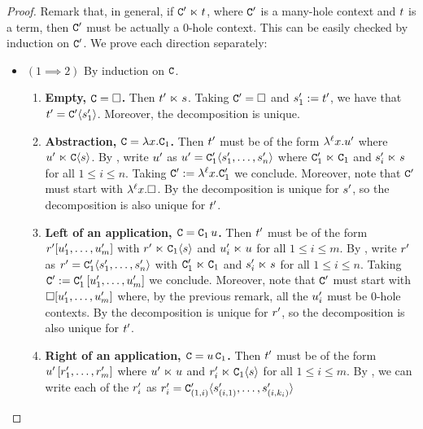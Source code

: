 \begin{proof}
Remark that, in general, if $\mathtt{C}' \mathrel{\ltimes} t$, where $\mathtt{C}'$ is a many-hole context and $t$ is a term,
then $\mathtt{C}'$ must be actually a $0$-hole context. This can be easily checked by induction on $\mathtt{C}'$.
We prove each direction separately:
\begin{itemize}
\item $(1 \implies 2)$
  By induction on $\mathtt{C}$.
  \begin{enumerate}
  \item {\bf Empty, $\mathtt{C} = \Box$.}
    Then $t' \mathrel{\ltimes} s$.
    Taking $\mathtt{C}' = \Box$ and $s'_1 := t'$,
    we have that $t' = \mathtt{C}'\langle s'_1\rangle$.
    Moreover, the decomposition is unique.
  \item {\bf Abstraction, $\mathtt{C} = \lambda x. \mathtt{C}_1$.}
    Then $t'$ must be of the form $\lambda^{\ell} x. u'$
    where $u' \mathrel{\ltimes} \mathtt{C}\langle s\rangle$.
    By \ih, write $u'$ as $u' = \mathtt{C}'_1\langle s'_1,\hdots,s'_n\rangle$
    where $\mathtt{C}'_1 \mathrel{\ltimes} \mathtt{C}_1$ and $s'_i \mathrel{\ltimes} s$ for all $1 \leq i \leq n$.
    Taking $\mathtt{C}' := \lambda^{\ell} x. \mathtt{C}'_1$ we conclude.
    Moreover, note that $\mathtt{C}'$ must start with $\lambda^{\ell} x. \Box$.
    By \ih the decomposition is unique for $s'$, so the decomposition is also unique for $t'$.
  \item {\bf Left of an application, $\mathtt{C} = \mathtt{C}_1\,u$.}
    Then $t'$ must be of the form $r'[u'_1,\hdots,u'_m]$
    with $r' \mathrel{\ltimes} \mathtt{C}_1\langle s\rangle$
    and $u'_i \mathrel{\ltimes} u$ for all $1 \leq i \leq m$.
    By \ih, write $r'$ as $r' = \mathtt{C}'_1\langle s'_1,\hdots,s'_n\rangle$
    with $\mathtt{C}'_1 \mathrel{\ltimes} \mathtt{C}_1$ and $s'_i \mathrel{\ltimes} s$ for all $1 \leq i \leq n$.
    Taking $\mathtt{C}' := \mathtt{C}'_1\,[u'_1,\hdots,u'_m]$ we conclude.
    Moreover, note that $\mathtt{C}'$ must start with $\Box[u'_1,\hdots,u'_m]$
    where, by the previous remark, all the $u'_i$ must be $0$-hole contexts.
    By \ih the decomposition is unique for $r'$, so the decomposition is also unique for $t'$.
  \item {\bf Right of an application, $\mathtt{C} = u\,\mathtt{C}_1$.}
    Then $t'$ must be of the form $u'\,[r'_1,\hdots,r'_m]$
    where $u' \mathrel{\ltimes} u$ and $r'_i \mathrel{\ltimes} \mathtt{C}_1\langle s\rangle$ for all $1 \leq i \leq m$.
    By \ih, we can write each of the $r'_i$ as $r'_i = \mathtt{C}'_{(1,i)}\langle s'_{(i,1)},\hdots,s'_{(i,k_i)}\rangle$

\end{enumerate}
\end{itemize}
\end{proof}
